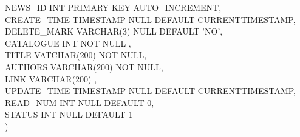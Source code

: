 \begin{enumerate}
            NEWS\_ID INT PRIMARY KEY AUTO\_INCREMENT,\\
            CREATE\_TIME TIMESTAMP NULL DEFAULT CURRENTTIMESTAMP,\\
            DELETE\_MARK VARCHAR(3) NULL DEFAULT 'NO',\\
            CATALOGUE INT NOT NULL ,\\
            TITLE VATCHAR(200) NOT NULL,\\
            AUTHORS VARCHAR(200) NOT NULL,\\
            LINK VARCHAR(200) ,\\
            UPDATE\_TIME TIMESTAMP NULL DEFAULT CURRENTTIMESTAMP,\\
            READ\_NUM INT NULL DEFAULT 0,\\
            STATUS INT NULL DEFAULT 1\\
        )
    \end{enumerate}

